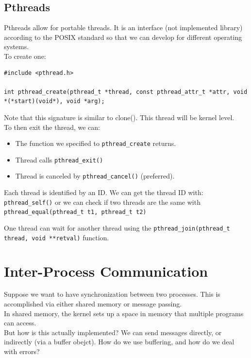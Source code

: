 \documentclass[12pt]{article}
\theoremstyle{definition}
\begin{document}
\subsection{Pthreads}
Pthreads allow for portable threads. It is an interface (not implemented library) according to the POSIX standard so that we can develop for different operating systems.
\\ \linebreak
To create one:
\begin{lstlisting}
#include <pthread.h>

int pthread_create(pthread_t *thread, const pthread_attr_t *attr, void *(*start)(void*), void *arg);

\end{lstlisting}
Note that this signature is similar to clone(). This thread will be kernel level.
\\ \linebreak
To then exit the thread, we can:
\begin{itemize}
	\item The function we specified to \texttt{pthread\_create} returns. 
	\item Thread calls \texttt{pthread\_exit()}
	\item Thread is canceled by \texttt{pthread\_cancel()} (preferred).
\end{itemize}
Each thread is identified by an ID. We can get the thread ID with: \texttt{pthread\_self()} or we can check if two threads are the same with \texttt{pthread\_equal(pthread\_t t1, pthread\_t t2)}
\\ \linebreak

One thread can wait for another thread using the \texttt{pthread\_join(pthread\_t thread, void **retval)} function. 

\section{Inter-Process Communication}
Suppose we want to have synchronization between two processes. This is accomplished via either shared memory or message passing.
\\ \linebreak
In shared memory, the kernel sets up a space in memory that multiple programs can access.
\\ \linebreak
 But how is this actually implemented? We can send messages directly, or indirectly (via a buffer obejct). How do we use buffering, and how do we deal with errors?
 
\end{document}

